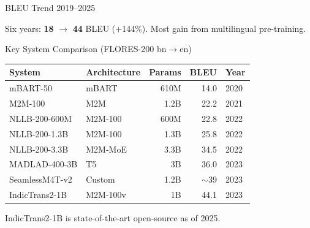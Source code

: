 \documentclass[aspectratio=169,10pt]{beamer}
\begin{document}
\begin{frame}{BLEU Trend 2019--2025}
  \begin{center}
  \end{center}
  Six years: \textbf{18} $\to$ \textbf{44} BLEU (+144\%). Most gain from multilingual pre-training.
\end{frame}

\begin{frame}{Key System Comparison (FLORES-200 bn$\to$en)}
  \small
  \begin{table}
  \begin{tabular}{llrrl}
    \toprule
    System & Architecture & Params & BLEU & Year \\
    \midrule
    mBART-50         & mBART    & 610M  & 14.0 & 2020 \\
    M2M-100          & M2M      & 1.2B  & 22.2 & 2021 \\
    NLLB-200-600M    & M2M-100  & 600M  & 22.8 & 2022 \\
    NLLB-200-1.3B    & M2M-100  & 1.3B  & 25.8 & 2022 \\
    NLLB-200-3.3B    & M2M-MoE  & 3.3B  & 34.5 & 2022 \\
    MADLAD-400-3B    & T5       & 3B    & 36.0 & 2023 \\
    SeamlessM4T-v2   & Custom   & 1.2B  & $\sim$39 & 2023 \\
    IndicTrans2-1B   & M2M-100v & 1B    & 44.1 & 2023 \\
    \bottomrule
  \end{tabular}
  \end{table}
  IndicTrans2-1B is state-of-the-art open-source as of 2025.
\end{frame}
\end{document}
